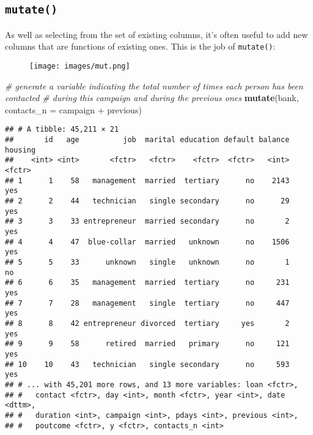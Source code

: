 \documentclass[]{book}
\newenvironment{Shaded}{\begin{snugshade}}{\end{snugshade}}
\newcommand{\KeywordTok}[1]{\textcolor[rgb]{0.13,0.29,0.53}{\textbf{{#1}}}}
\newcommand{\DataTypeTok}[1]{\textcolor[rgb]{0.13,0.29,0.53}{{#1}}}
\newcommand{\StringTok}[1]{\textcolor[rgb]{0.31,0.60,0.02}{{#1}}}
\newcommand{\CommentTok}[1]{\textcolor[rgb]{0.56,0.35,0.01}{\textit{{#1}}}}
\newcommand{\NormalTok}[1]{{#1}}
\begin{document}
\clearpage

\subsection{\texorpdfstring{\texttt{mutate()}}{mutate()}}\label{mutate}

As well as selecting from the set of existing columns, it's often useful
to add new columns that are functions of existing ones. This is the job
of \texttt{mutate()}:

\begin{figure}[htbp]
\centering
\texttt{[image: images/mut.png]}
\caption{}
\end{figure}

\begin{Shaded}
\begin{Highlighting}[]
\CommentTok{# generate a variable indicating the total number of times each person has been contacted }
\CommentTok{# during this campaign and during the previous ones }
\KeywordTok{mutate}\NormalTok{(bank, }\DataTypeTok{contacts_n =} \NormalTok{campaign +}\StringTok{ }\NormalTok{previous)}
\end{Highlighting}
\end{Shaded}

\begin{verbatim}
## # A tibble: 45,211 × 21
##       id   age          job  marital education default balance housing
##    <int> <int>       <fctr>   <fctr>    <fctr>  <fctr>   <int>  <fctr>
## 1      1    58   management  married  tertiary      no    2143     yes
## 2      2    44   technician   single secondary      no      29     yes
## 3      3    33 entrepreneur  married secondary      no       2     yes
## 4      4    47  blue-collar  married   unknown      no    1506     yes
## 5      5    33      unknown   single   unknown      no       1      no
## 6      6    35   management  married  tertiary      no     231     yes
## 7      7    28   management   single  tertiary      no     447     yes
## 8      8    42 entrepreneur divorced  tertiary     yes       2     yes
## 9      9    58      retired  married   primary      no     121     yes
## 10    10    43   technician   single secondary      no     593     yes
## # ... with 45,201 more rows, and 13 more variables: loan <fctr>,
## #   contact <fctr>, day <int>, month <fctr>, year <int>, date <dttm>,
## #   duration <int>, campaign <int>, pdays <int>, previous <int>,
## #   poutcome <fctr>, y <fctr>, contacts_n <int>
\end{verbatim}
\end{document}
